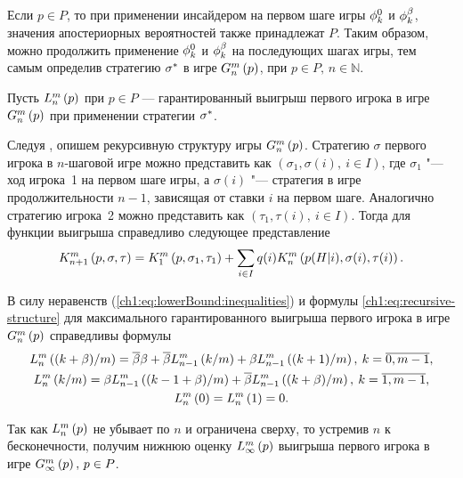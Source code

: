 {\begin{remark}
  \label{ch1:remark:posterior-probs}
  Если $p \in P$, то при применении инсайдером на первом шаге игры $\fEven$ и $\fOdd$, значения апостериорных вероятностей также принадлежат $P$.
  Таким образом, можно продолжить применение $\fEven$ и $\fOdd$ на последующих шагах игры, тем самым определив стратегию $\fOpt$ в игре $\generalGame{n}{p}$, при $p \in P, \, n \in \mathbb{N}$.
\end{remark}

Пусть $\lowerBound[n]{p}$ при $p \in P$ --- гарантированный выигрыш первого игрока в игре $\generalGame{n}{p}$ при применении стратегии $\fOpt$.

Следуя \cite{domansky07}, опишем рекурсивную структуру игры $\generalGame{n}{p}$.
Стратегию $\sigma$ первого игрока в $n$-шаговой игре можно представить как $(\sigma_1, \sigma(i),\ i \in I)$, где $\sigma_1$ "--- ход
игрока~1 на первом шаге игры, а $\sigma(i)$ "--- стратегия в игре продолжительности $n-1$, зависящая от ставки $i$ на первом шаге.
Аналогично стратегию игрока~2 можно представить как $(\tau_1, \tau(i),\ i \in I)$.
Тогда для функции выигрыша справедливо следующее представление
\begin{equation}
  \label{ch1:eq:recursive-structure}
  \firstPlayerPayoff{n+1}{p}{\sigma}{\tau} = 
  \firstPlayerPayoff{1}{p}{\sigma_1}{\tau_1} + 
  \sum_{i \in I} q(i) \firstPlayerPayoff{n}{p(H|i)}{\sigma(i)}{\tau(i)}.
\end{equation}

В силу неравенств (\ref{ch1:eq:lowerBound:inequalities}) и формулы \eqref{ch1:eq:recursive-structure} для максимального гарантированного выигрыша первого игрока в игре $\generalGame{n}{p}$ справедливы формулы
\begin{equation}
  \begin{gathered}
    \label{ch1:eq:lowerBound:recurrence:function}
    \lowerBound[n]{(k + \Co)/m} = \DCo\Co + \DCo\lowerBound[n-1]{k/m} +
    \Co\lowerBound[n-1]{(k + 1)/m}, \: k = \overline{0, m-1}, \\
    \lowerBound[n]{k/m} = \Co\lowerBound[n-1]{(k - 1 + \Co)/m} +
    \DCo\lowerBound[n-1]{(k + \Co)/m}, \: k = \overline{1, m-1}, \\
    \lowerBound[n]{0} = \lowerBound[n]{1} = 0.
  \end{gathered}
\end{equation}

Так как $\lowerBound[n]{p}$ не убывает по $n$ и ограничена сверху, то устремив $n$ к бесконечности, получим нижнюю оценку $\lowerBound{p}$ выигрыша первого игрока в игре $\infiniteGame{p}, \, p \in P$.

}
